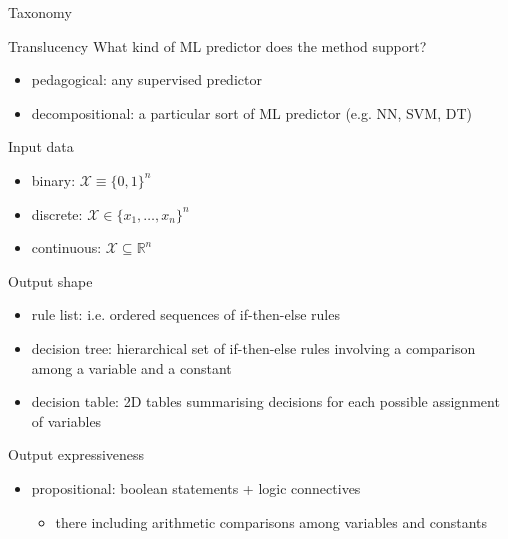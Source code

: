 \documentclass[presentation]{beamer}\mode<presentation>{\usetheme{AMSBolognaFC}}
\begin{document}
\begin{frame}[allowframebreaks]{Taxonomy}
    \begin{block}{Translucency}
       What kind of ML predictor does the \ske{} method support?
        \begin{itemize}
            \item pedagogical: any supervised predictor
            \item decompositional: a particular sort of ML predictor (e.g. NN, SVM, DT)      
        \end{itemize} 
     \end{block}

    \begin{block}{Input data}
        \begin{itemize}
            \item binary: $\mathcal{X} \equiv \{0, 1\}^n$
            \item discrete: $\mathcal{X} \in \{x_1, \ldots, x_n\}^n$   
            \item continuous: $\mathcal{X} \subseteq \mathbb{R}^n$     
        \end{itemize} 
    \end{block}
        
    \framebreak
        
    \begin{block}{Output shape}
        \begin{itemize}
            \item rule list: i.e. ordered sequences of if-then-else rules
            \item decision tree: hierarchical set of if-then-else rules involving a comparison among a variable and a constant   
            \item decision table: 2D tables summarising decisions for each possible assignment of variables 
        \end{itemize} 
    \end{block}
        
    \framebreak
        
    \begin{block}{Output expressiveness}
        \begin{itemize}
            \item propositional: boolean statements + logic connectives
            \begin{itemize}
                \item there including arithmetic comparisons among variables and constants
            \end{itemize}
            

\end{itemize}
\end{block}
\end{frame}
\end{document}
